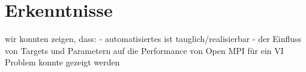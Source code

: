 \section{Erkenntnisse}
\label{sec:erkenntnisse}
wir konnten zeigen, dass:
- automatisiertes ist tauglich/realisierbar
- der Einfluss von Targets und Parametern auf die Performance von Open MPI für ein VI Problem konnte gezeigt werden
